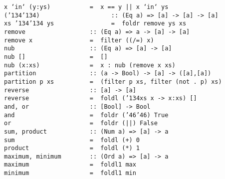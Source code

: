 \mbox{\tt x\ `in`\ (y:ys)\ \ \ \ \ \ \ \ \ \ \ =\ \ x\ ==\ y\ ||\ x\ `in`\ ys}
%
\eprogB\noindent\bprogB
\mbox{\tt ({\char'134}{\char'134})\ \ \ \ \ \ \ \ \ \ \ \ \ \ \ \ \ \ \ \ ::\ (Eq\ a)\ =>\ [a]\ ->\ [a]\ ->\ [a]}\\
\mbox{\tt xs\ {\char'134}{\char'134}\ ys\ \ \ \ \ \ \ \ \ \ \ \ \ \ \ \ =\ \ foldr\ remove\ ys\ xs}
%
\eprogB\noindent\bprogB
\mbox{\tt remove\ \ \ \ \ \ \ \ \ \ \ \ \ \ \ \ \ \ ::\ (Eq\ a)\ =>\ a\ ->\ [a]\ ->\ [a]}\\
\mbox{\tt remove\ x\ \ \ \ \ \ \ \ \ \ \ \ \ \ \ \ =\ \ filter\ ((/=)\ x)}
%
\eprogB\noindent\bprogB
\mbox{\tt nub\ \ \ \ \ \ \ \ \ \ \ \ \ \ \ \ \ \ \ \ \ ::\ (Eq\ a)\ =>\ [a]\ ->\ [a]}\\
\mbox{\tt nub\ []\ \ \ \ \ \ \ \ \ \ \ \ \ \ \ \ \ \ =\ \ []}\\
\mbox{\tt nub\ (x:xs)\ \ \ \ \ \ \ \ \ \ \ \ \ \ =\ \ x\ :\ nub\ (remove\ x\ xs)}
%
\eprogB\noindent\bprogB
\mbox{\tt partition\ \ \ \ \ \ \ \ \ \ \ \ \ \ \ ::\ (a\ ->\ Bool)\ ->\ [a]\ ->\ ([a],[a])}\\
\mbox{\tt partition\ p\ xs\ \ \ \ \ \ \ \ \ \ =\ \ (filter\ p\ xs,\ filter\ (not\ .\ p)\ xs)}
%
\eprogB\noindent\bprogB
\mbox{\tt reverse\ \ \ \ \ \ \ \ \ \ \ \ \ \ \ \ \ ::\ [a]\ ->\ [a]}\\
\mbox{\tt reverse\ \ \ \ \ \ \ \ \ \ \ \ \ \ \ \ \ =\ \ foldl\ ({\char'134}xs\ x\ ->\ x:xs)\ []}
%
\eprogB\noindent\bprogB
\mbox{\tt and,\ or\ \ \ \ \ \ \ \ \ \ \ \ \ \ \ \ \ ::\ [Bool]\ ->\ Bool}\\
\mbox{\tt and\ \ \ \ \ \ \ \ \ \ \ \ \ \ \ \ \ \ \ \ \ =\ \ foldr\ ({\char'46}{\char'46})\ True}\\
\mbox{\tt or\ \ \ \ \ \ \ \ \ \ \ \ \ \ \ \ \ \ \ \ \ \ =\ \ foldr\ (||)\ False}
%
%
\eprogB\noindent\bprogB
\mbox{\tt sum,\ product\ \ \ \ \ \ \ \ \ \ \ \ ::\ (Num\ a)\ =>\ [a]\ ->\ a}\\
\mbox{\tt sum\ \ \ \ \ \ \ \ \ \ \ \ \ \ \ \ \ \ \ \ \ =\ \ foldl\ (+)\ 0}\\
\mbox{\tt product\ \ \ \ \ \ \ \ \ \ \ \ \ \ \ \ \ =\ \ foldl\ (*)\ 1}
%
%
\eprogB\noindent\bprogB
\mbox{\tt maximum,\ minimum\ \ \ \ \ \ \ \ ::\ (Ord\ a)\ =>\ [a]\ ->\ a}\\
\mbox{\tt maximum\ \ \ \ \ \ \ \ \ \ \ \ \ \ \ \ \ =\ \ foldl1\ max}\\
\mbox{\tt minimum\ \ \ \ \ \ \ \ \ \ \ \ \ \ \ \ \ =\ \ foldl1\ min}
